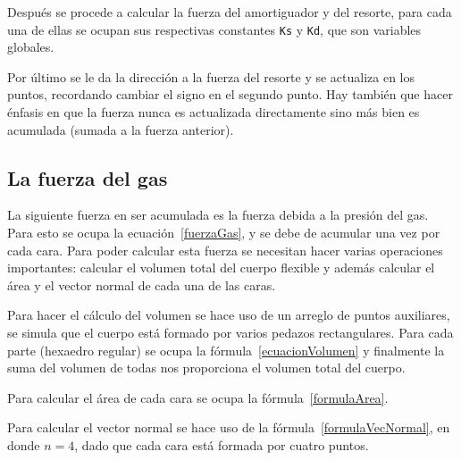 Después se procede a calcular la fuerza del amortiguador y del resorte, para cada una de ellas se ocupan sus respectivas constantes \verb|Ks| y \verb|Kd|, que son variables globales.

Por último se le da la dirección a la fuerza del resorte y se actualiza en los puntos, recordando cambiar el signo en el segundo punto.
Hay también que hacer énfasis en que la fuerza nunca es actualizada directamente sino más bien es acumulada (sumada a la fuerza anterior).

\subsection{La fuerza del gas}
\label{sec:fuerzaGas}

La siguiente fuerza en ser acumulada es la fuerza debida a la presión del gas. Para esto se ocupa la ecuación~\ref{fuerzaGas}, y se debe de acumular una vez por cada cara.
Para poder calcular esta fuerza se necesitan hacer varias operaciones importantes: calcular el volumen total del cuerpo flexible y además calcular el área y el vector normal de cada una de las caras.

Para hacer el cálculo del volumen se hace uso de un arreglo de puntos auxiliares, se simula que el cuerpo está formado por varios pedazos rectangulares.
Para cada parte (hexaedro regular) se ocupa la fórmula~\ref{ecuacionVolumen} y finalmente la suma del volumen de todas nos proporciona el volumen total del cuerpo.

Para calcular el área de cada cara se ocupa la fórmula~\ref{formulaArea}.

Para calcular el vector normal se hace uso de la fórmula~\ref{formulaVecNormal}, en donde $n=4$, dado que cada cara está formada por cuatro puntos.


